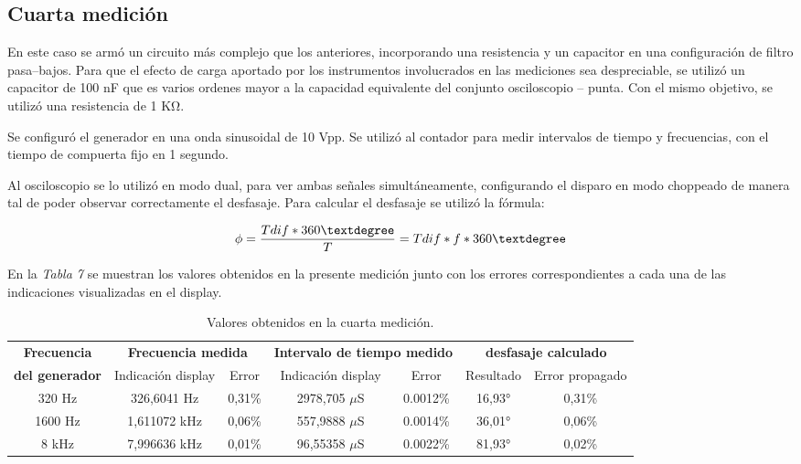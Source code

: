 \documentclass{article}
\begin{document}
\subsection{Cuarta medición}
\medskip

	En este caso se armó un circuito más complejo que los anteriores, incorporando una resistencia y un capacitor en una configuración de filtro pasa–bajos. Para que el efecto de carga aportado por los instrumentos involucrados en las mediciones sea despreciable, se utilizó un capacitor de 100 nF que es varios ordenes mayor a la capacidad equivalente del conjunto osciloscopio – punta. Con el mismo objetivo, se utilizó una resistencia de 1 KΩ.
	\par
	Se configuró el generador en una onda sinusoidal de 10 Vpp. Se utilizó al contador para medir  intervalos de tiempo y frecuencias, con el tiempo de compuerta fijo en 1 segundo.
	\par
	Al osciloscopio se lo utilizó en modo dual, para ver ambas señales simultáneamente, configurando el disparo en modo choppeado de manera tal de poder observar correctamente el desfasaje. Para calcular el desfasaje se utilizó la fórmula:
\medskip

\begin{equation}
	\phi = {Tdif * 360° \over T} = {Tdif * f * 360°}
\end{equation}
\bigskip


	En la \textit{Tabla 7} se muestran los valores obtenidos en la presente medición junto con los errores correspondientes a cada una de las indicaciones visualizadas en el display.
\bigskip


\begin{table}[!hbt]
	\begin{center}

		\begin{tabular}{|c|c|c|c|c|c|c|} \hline
			\textbf{Frecuencia} & \multicolumn{2}{c|}{\textbf{Frecuencia medida}} & \multicolumn{2}{c|}{\textbf{Intervalo de tiempo medido}} & \multicolumn{2}{c|}{\textbf{desfasaje calculado}} \\\cline{2-7}
			\textbf{del generador} & Indicación display & Error & Indicación display & Error & Resultado & Error propagado \\\hline
			
			320 Hz & 326,6041 Hz & 0,31\% & 2978,705 $\mu$S & 0.0012\% & 16,93° & 0,31\% \\\hline
			1600 Hz & 1,611072 kHz & 0,06\% & 557,9888 $\mu$S & 0.0014\% & 36,01° & 0,06\% \\\hline
			8 kHz & 7,996636 kHz & 0,01\% & 96,55358 $\mu$S & 0.0022\% & 81,93° & 0,02\% \\\hline

		\end{tabular}

	\caption{Valores obtenidos en la cuarta medición.}
	\end{center}
\end{table}
\medskip
\end{document}
